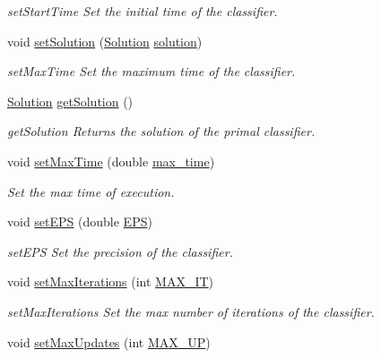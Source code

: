 \begin{DoxyCompactItemize}
\begin{DoxyCompactList}\small\item\em set\+Start\+Time Set the initial time of the classifier. \end{DoxyCompactList}\item 
void \hyperlink{class_classifier_aef6cb633eed60712f8948a404f630e82}{set\+Solution} (\hyperlink{class_solution}{Solution} \hyperlink{class_classifier_a8e70651d36fa396f55028847acd6ae50}{solution})
\begin{DoxyCompactList}\small\item\em set\+Max\+Time Set the maximum time of the classifier. \end{DoxyCompactList}\item 
\hyperlink{class_solution}{Solution} \hyperlink{class_classifier_afd2b54ada10af9f4be1c4d326b180dc7}{get\+Solution} ()
\begin{DoxyCompactList}\small\item\em get\+Solution Returns the solution of the primal classifier. \end{DoxyCompactList}\item 
void \hyperlink{class_classifier_a5da324a0de94b7171484f3b1f1f22fbd}{set\+Max\+Time} (double \hyperlink{class_classifier_a191089f044af0f4dd51f37aaff78d8f6}{max\+\_\+time})
\begin{DoxyCompactList}\small\item\em Set the max time of execution. \end{DoxyCompactList}\item 
void \hyperlink{class_classifier_a9cc5a1d92243f9d9b530347be1ac7367}{set\+E\+PS} (double \hyperlink{class_classifier_ad7cd0cfea68461340df2adb0c132dc93}{E\+PS})
\begin{DoxyCompactList}\small\item\em set\+E\+PS Set the precision of the classifier. \end{DoxyCompactList}\item 
void \hyperlink{class_classifier_a58540f77a22c0f1774d0089fac713498}{set\+Max\+Iterations} (int \hyperlink{class_classifier_a9cab88ab4489d771256bffb1717c1644}{M\+A\+X\+\_\+\+IT})
\begin{DoxyCompactList}\small\item\em set\+Max\+Iterations Set the max number of iterations of the classifier. \end{DoxyCompactList}\item 
void \hyperlink{class_classifier_ad8930d5e6002299bdb840d4542229f02}{set\+Max\+Updates} (int \hyperlink{class_classifier_abb8b95854801151e78a1d9f6a2173c22}{M\+A\+X\+\_\+\+UP})

\end{DoxyCompactItemize}

